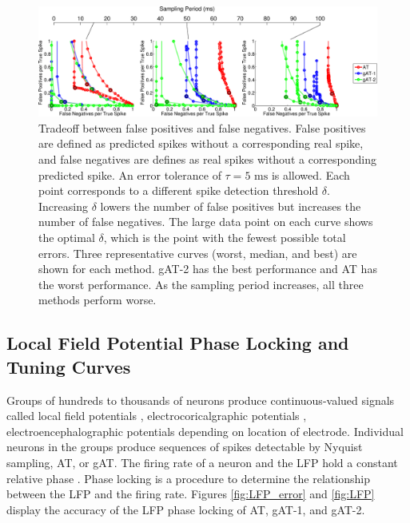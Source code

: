 \documentclass[10 pt]{article}
\begin{document}
\begin{figure}[htbp]
\begin{center}
\includegraphics[scale=0.30]{ROC.eps}
\caption{Tradeoff between false positives and false negatives. False positives are defined as predicted spikes without a corresponding real spike, and false negatives are defines as real spikes without a corresponding predicted spike. An error tolerance of $\tau = 5\textrm{ ms}$ is allowed. Each point corresponds to a different spike detection threshold $\delta$. Increasing $\delta$ lowers the number of false positives but increases the number of false negatives. The large data point on each curve shows the optimal $\delta$, which is the point with the fewest possible total errors. Three representative curves (worst, median, and best) are shown for each method. gAT-2 has the best performance and AT has the worst performance. As the sampling period increases, all three methods perform worse.} %
\label{fig:ROC}
\end{center}
\end{figure}

\subsection{Local Field Potential Phase Locking and Tuning Curves}

Groups of hundreds to thousands of neurons produce continuous-valued signals called local field potentials \cite{???}, electrocoricalgraphic potentials \cite{???}, electroencephalographic potentials \cite{???} depending on location of electrode.
Individual neurons in the groups produce sequences of spikes detectable by Nyquist sampling, AT, or gAT.
The firing rate of a neuron and the LFP hold a constant relative phase \cite{???}.
Phase locking is a procedure to determine the relationship between the LFP and the firing rate.
Figures \ref{fig:LFP_error} and \ref{fig:LFP} display the accuracy of the LFP phase locking of AT, gAT-1, and gAT-2.
\end{document}
